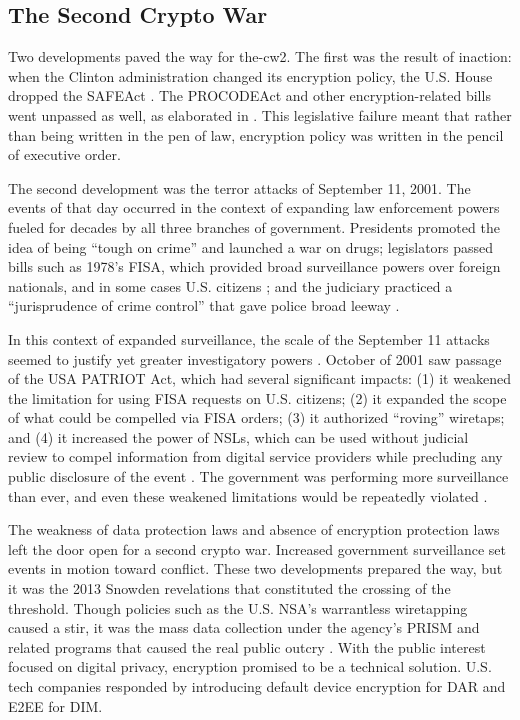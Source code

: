 \subsection{The Second Crypto War}
\label{sec-history-cw2}

Two developments paved the way for \ac{the-cw2}. The first was the result of inaction: when the Clinton administration
changed its encryption policy, the U.S. House dropped the \ac{SAFEAct} \cite{goodlatte_hr3011_1996}. The \ac{PROCODEAct}
and other encryption-related bills went unpassed as well, as elaborated in . This legislative
failure meant that rather than being written in the pen of law, encryption policy was written in the pencil of executive
order.

The second development was the terror attacks of September 11, 2001. The events of that day occurred in the context of
expanding law enforcement powers fueled for decades by all three branches of government. Presidents promoted the idea of
being ``tough on crime'' and launched a war on drugs; legislators passed bills such as 1978's \ac{FISA}, which provided
broad surveillance powers over foreign nationals, and in some cases U.S. citizens \cite{rodino_1978}; and the judiciary
practiced a ``jurisprudence of crime control'' that gave police broad leeway \cite{gizzi_fourth_2016}.

In this context of expanded surveillance, the scale of the September 11 attacks seemed to justify yet greater
investigatory powers \cite{bloss_escalating_2007}. October of 2001 saw passage of the USA PATRIOT Act, which had several
significant impacts: (1) it weakened the limitation for using \ac{FISA} requests on U.S. citizens; (2) it expanded the
scope of what could be compelled via \ac{FISA} orders; (3) it authorized ``roving'' wiretaps; and (4) it increased the
power of \acp{NSL}, which can be used without judicial review to compel information from digital service providers while
precluding any public disclosure of the event \cite{sensenbrenner_2001} \cite{shamsi_2011}. The government was
performing more surveillance than ever, and even these weakened limitations would be repeatedly violated
\cite{shamsi_2011} \cite{tucker_2020}.

The weakness of data protection laws and absence of encryption protection laws left the door open for a second crypto
war. Increased government surveillance set events in motion toward conflict. These two developments prepared the way,
but it was the 2013 Snowden revelations that constituted the crossing of the threshold. Though policies such as the U.S.
\ac{NSA}'s warrantless wiretapping caused a stir, it was the mass data collection under the agency's \ac{PRISM} and
related programs that caused the real public outcry \cite{landau_making_2013}. With the public interest focused on
digital privacy, encryption promised to be a technical solution. U.S. tech companies responded by introducing default
device encryption for \acl{DAR} and \acl{E2EE} for \acl{DIM}.

